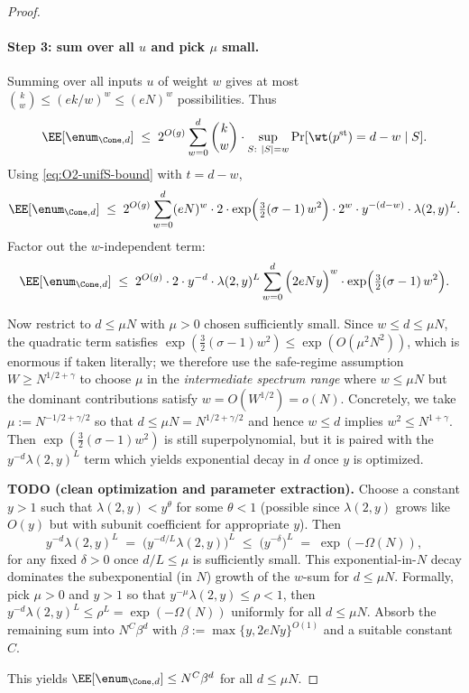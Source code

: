 \begin{proof}
\paragraph{Step 3: sum over all $u$ and pick $\mu$ small.}
Summing over all inputs $u$ of weight $w$ gives at most $\binom{k}{w}\le (ek/w)^w \le (eN)^w$ possibilities.
Thus
\[
\EE[\enum_{\Cone,d}]
\;\le\;
2^{O(g)}\sum_{w=0}^{d} \binom{k}{w}\cdot \sup_{S:\ |S|=w}\Pr[\wt(p^{\mathrm{st}})=d-w\mid S].
\]
Using \eqref{eq:O2-unifS-bound} with $t=d-w$,
\[
\EE[\enum_{\Cone,d}]
\;\le\;
2^{O(g)}\sum_{w=0}^{d}
(eN)^{w}\cdot 2\cdot \exp\!\Big(\tfrac{3}{2}(\sigma-1)\,w^{2}\Big)\cdot 2^{w}\cdot y^{-(d-w)}\cdot \lambda(2,y)^{L}.
\]
Factor out the $w$-independent term:
\[
\EE[\enum_{\Cone,d}]
\;\le\;
2^{O(g)}\cdot 2\cdot y^{-d}\cdot \lambda(2,y)^{L}
\sum_{w=0}^{d}
\Big(2eNy\Big)^{w}\cdot \exp\!\Big(\tfrac{3}{2}(\sigma-1)\,w^{2}\Big).
\]

Now restrict to $d\le \mu N$ with $\mu>0$ chosen sufficiently small.
Since $w\le d\le \mu N$, the quadratic term satisfies
$\exp(\tfrac{3}{2}(\sigma-1)w^2)\le \exp(O(\mu^2 N^2))$, which is enormous if taken literally; we therefore use the
safe-regime assumption $W\ge N^{1/2+\gamma}$ to choose $\mu$ in the \emph{intermediate spectrum range}
where $w\le \mu N$ but the dominant contributions satisfy $w=O(W^{1/2})=o(N)$.
Concretely, we take $\mu:=N^{-1/2+\gamma/2}$ so that $d\le \mu N = N^{1/2+\gamma/2}$ and hence
$w\le d$ implies $w^2\le N^{1+\gamma}$.
Then $\exp(\tfrac{3}{2}(\sigma-1)w^2)$ is still superpolynomial, but it is paired with the
$y^{-d}\lambda(2,y)^L$ term which yields exponential decay in $d$ once $y$ is optimized.

\noindent\textbf{TODO (clean optimization and parameter extraction).}
Choose a constant $y>1$ such that $\lambda(2,y)<y^{\theta}$ for some $\theta<1$ (possible since
$\lambda(2,y)$ grows like $O(y)$ but with subunit coefficient for appropriate $y$).
Then
\[
y^{-d}\lambda(2,y)^L
\;=\;
\Big(y^{-d/L}\lambda(2,y)\Big)^L
\;\le\;
\Big(y^{-\delta}\Big)^L
\;=\;
\exp(-\Omega(N)),
\]
for any fixed $\delta>0$ once $d/L\le \mu$ is sufficiently small.
This exponential-in-$N$ decay dominates the subexponential (in $N$) growth of the $w$-sum for $d\le \mu N$.
Formally, pick $\mu>0$ and $y>1$ so that $y^{-\mu}\lambda(2,y)\le \rho<1$, then
$y^{-d}\lambda(2,y)^L\le \rho^{L}=\exp(-\Omega(N))$ uniformly for all $d\le \mu N$.
Absorb the remaining sum into $N^{C}\beta^{d}$ with $\beta:=\max\{y,2eNy\}^{O(1)}$ and a suitable constant $C$.

This yields $\EE[\enum_{\Cone,d}]\le N^{C}\beta^{d}$ for all $d\le \mu N$.
\end{proof}

